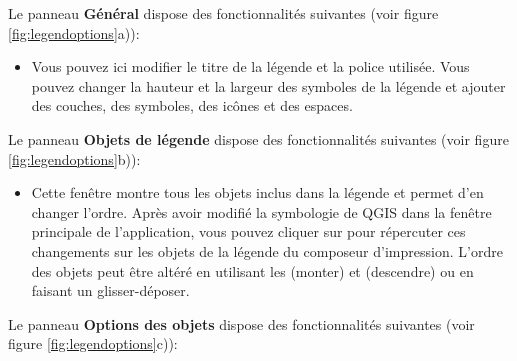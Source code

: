 
Le panneau \textbf{Général} dispose des fonctionnalités suivantes (voir figure \ref{fig:legendoptions}a)):

\begin{itemize}[label=--]
\item Vous pouvez ici modifier le titre de la légende et la police utilisée. Vous pouvez changer la hauteur et la largeur des symboles de la légende et ajouter des couches, des symboles, des icônes et des espaces.
\end{itemize}


Le panneau \textbf{Objets de légende} dispose des fonctionnalités suivantes (voir figure \ref{fig:legendoptions}b)):

\begin{itemize}[label=--]
\item Cette fenêtre montre tous les objets inclus dans la légende et permet d'en changer l'ordre. Après avoir modifié la symbologie de QGIS dans la fenêtre principale de l'application, vous pouvez cliquer sur  pour répercuter ces changements sur les objets de la légende du composeur d'impression. L'ordre des objets peut être altéré en utilisant les \button{^} (monter) et  (descendre) ou en faisant un glisser-déposer.
\end{itemize}


Le panneau \textbf{Options des objets} dispose des fonctionnalités suivantes (voir figure \ref{fig:legendoptions}c)):

